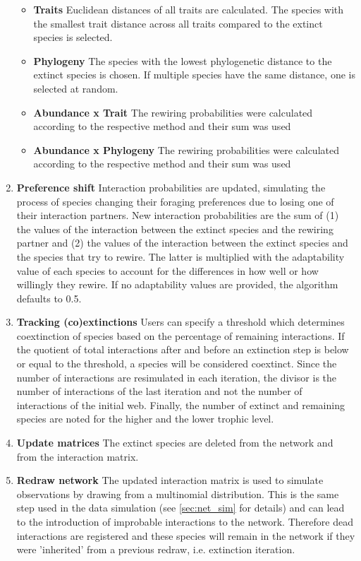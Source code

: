 \documentclass[12pt,a4paper]{article}
\begin{document}
\begin{enumerate}
\begin{itemize}
		\item \label{itm:trait_rew} \textbf{Traits} {\small Euclidean distances of all traits are calculated. The species with the smallest trait distance across all traits compared to the extinct species is selected.}
		\item \label{itm:phylo_rew} \textbf{Phylogeny} {\small The species with the lowest phylogenetic distance to the extinct species is chosen. If multiple species have the same distance, one is selected at random.}
		\item \label{itm:AT_rew} \textbf{Abundance x Trait} {\small The rewiring probabilities were calculated according to the respective method and their sum was used}
		\item \label{itm:AP_rew} \textbf{Abundance x Phylogeny} {\small The rewiring probabilities were calculated according to the respective method and their sum was used}
		\end{itemize}
	\item \label{itm:shift} \textbf{Preference shift} {\small Interaction probabilities are updated, simulating the process of species changing their foraging preferences due to losing one of their interaction partners. New interaction probabilities are the sum of (1) the values of the interaction between the extinct species and the rewiring partner and (2) the values of the interaction between the extinct species and the species that try to rewire. The latter is multiplied with the adaptability value of each species to account for the differences in how well or how willingly they rewire. If no adaptability values are provided, the algorithm defaults to 0.5.}
	\item  \label{itm:track} \textbf{Tracking (co)extinctions} {\small Users can specify a threshold which determines coextinction of species based on the percentage of remaining interactions. If the quotient of total interactions after and before an extinction step is below or equal to the threshold, a species will be considered coextinct. Since the number of interactions are resimulated in each iteration, the divisor is the number of interactions of the last iteration and not the number of interactions of the initial web. Finally, the number of extinct and remaining species are noted for the higher and the lower trophic level.}
	\item \label{itm:update} \textbf{Update matrices} {\small The extinct species are deleted from the network and from the interaction matrix.}
	\item \label{itm:redraw} \textbf{Redraw network} {\small The updated interaction matrix is used to simulate observations by drawing from a multinomial distribution. This is the same step used in the data simulation (see \ref{sec:net_sim} for details) and can lead to the introduction of improbable interactions to the network. Therefore dead interactions are registered and these species will remain in the network if they were 'inherited' from a previous redraw, i.e. extinction iteration.}
	\end{enumerate}
\end{document}

